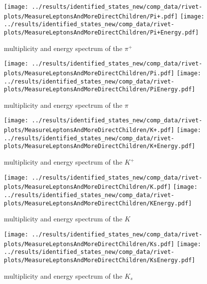 \begin{figure}[h]
  \centering
  \texttt{[image: ../results/identified\_states\_new/comp\_data/rivet-plots/MeasureLeptonsAndMoreDirectChildren/Pi+.pdf]}
  \texttt{[image: ../results/identified\_states\_new/comp\_data/rivet-plots/MeasureLeptonsAndMoreDirectChildren/Pi+Energy.pdf]}
  \caption{multiplicity and energy spectrum of the \(\pi^+\)}
\end{figure}
\begin{figure}[h]
  \centering
  \texttt{[image: ../results/identified\_states\_new/comp\_data/rivet-plots/MeasureLeptonsAndMoreDirectChildren/Pi.pdf]}
  \texttt{[image: ../results/identified\_states\_new/comp\_data/rivet-plots/MeasureLeptonsAndMoreDirectChildren/PiEnergy.pdf]}
  \caption{multiplicity and energy spectrum of the \(\pi\)}
\end{figure}
\begin{figure}[h]
  \centering
  \texttt{[image: ../results/identified\_states\_new/comp\_data/rivet-plots/MeasureLeptonsAndMoreDirectChildren/K+.pdf]}
  \texttt{[image: ../results/identified\_states\_new/comp\_data/rivet-plots/MeasureLeptonsAndMoreDirectChildren/K+Energy.pdf]}
  \caption{multiplicity and energy spectrum of the \(K^+\)}
\end{figure}
\begin{figure}[h]
  \centering
  \texttt{[image: ../results/identified\_states\_new/comp\_data/rivet-plots/MeasureLeptonsAndMoreDirectChildren/K.pdf]}
  \texttt{[image: ../results/identified\_states\_new/comp\_data/rivet-plots/MeasureLeptonsAndMoreDirectChildren/KEnergy.pdf]}
  \caption{multiplicity and energy spectrum of the \(K\)}
\end{figure}
\begin{figure}[h]
  \centering
  \texttt{[image: ../results/identified\_states\_new/comp\_data/rivet-plots/MeasureLeptonsAndMoreDirectChildren/Ks.pdf]}
  \texttt{[image: ../results/identified\_states\_new/comp\_data/rivet-plots/MeasureLeptonsAndMoreDirectChildren/KsEnergy.pdf]}
  \caption{multiplicity and energy spectrum of the \(K_s\)}
\end{figure}

